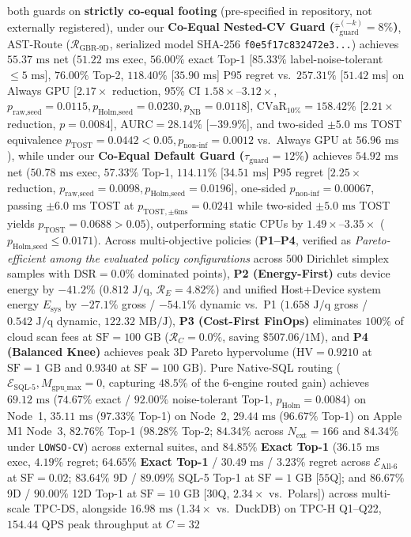 \documentclass[10pt,a4paper]{article}
\begin{document}
both guards on \textbf{strictly co-equal footing} (pre-specified in repository, not externally registered), under our \textbf{Co-Equal Nested-CV Guard ($\hat{\tau}_{\text{guard}}^{(-k)}=8\%$)}, AST-Route ($\mathcal{R}_{\text{GBR-9D}}$, serialized model SHA-256 \texttt{f0e5f17c832472e3...}) achieves $55.37\text{ ms}$ net ($51.22\text{ ms}$ exec, $56.00\%$ exact Top-1 [$85.33\%$ label-noise-tolerant $\le 5\text{ ms}$], $76.00\%$ Top-2, $118.40\%$ [$35.90\text{ ms}$] P95 regret vs.\ $257.31\%$ [$51.42\text{ ms}$] on Always GPU [$2.17\times$ reduction, 95\% CI $1.58\times\text{--}3.12\times$, $p_{\text{raw,seed}}=0.0115, p_{\text{Holm,seed}}=0.0230, p_{\text{NB}}=0.0118$], $\text{CVaR}_{10\%}=158.42\%$ [$2.21\times$ reduction, $p=0.0084$], $\text{AURC}=28.14\%$ [$-39.9\%$], and two-sided $\pm 5.0\text{ ms}$ TOST equivalence $p_{\text{TOST}}=0.0442 < 0.05, p_{\text{non-inf}}=0.0012$ vs.\ Always GPU at $56.96\text{ ms}$), while under our \textbf{Co-Equal Default Guard ($\tau_{\text{guard}}=12\%$)} achieves $54.92\text{ ms}$ net ($50.78\text{ ms}$ exec, $57.33\%$ Top-1, $114.11\%$ [$34.51\text{ ms}$] P95 regret [$2.25\times$ reduction, $p_{\text{raw,seed}}=0.0098, p_{\text{Holm,seed}}=0.0196$], one-sided $p_{\text{non-inf}}=0.00067$, passing $\pm 6.0\text{ ms}$ TOST at $p_{\text{TOST},\pm 6\text{ms}}=0.0241$ while two-sided $\pm 5.0\text{ ms}$ TOST yields $p_{\text{TOST}}=0.0688 > 0.05$), outperforming static CPUs by $1.49\times\text{--}3.35\times$ ($p_{\text{Holm,seed}}\le 0.0171$). Across multi-objective policies (\textbf{P1--P4}, verified as \emph{Pareto-efficient among the evaluated policy configurations} across $500$ Dirichlet simplex samples with $\text{DSR}=0.0\%$ dominated points), \textbf{P2 (Energy-First)} cuts device energy by $-41.2\%$ ($0.812\text{ J/q}$, $\mathcal{R}_E=4.82\%$) and unified Host+Device system energy $E_{\text{sys}}$ by $-27.1\%$ gross / $-54.1\%$ dynamic vs.\ P1 ($1.658\text{ J/q}$ gross / $0.542\text{ J/q}$ dynamic, $122.32\text{ MB/J}$), \textbf{P3 (Cost-First FinOps)} eliminates $100\%$ of cloud scan fees at $\text{SF}=100\text{ GB}$ ($\mathcal{R}_C=0.0\%$, saving $\$507.06/1\text{M}$), and \textbf{P4 (Balanced Knee)} achieves peak 3D Pareto hypervolume ($\text{HV}=0.9210$ at $\text{SF}=1\text{ GB}$ and $0.9340$ at $\text{SF}=100\text{ GB}$). Pure Native-SQL routing ($\mathcal{E}_{\text{SQL-5}}, M_{\text{gpu\_max}}=0$, capturing $48.5\%$ of the 6-engine routed gain) achieves $69.12\text{ ms}$ ($74.67\%$ exact / $92.00\%$ noise-tolerant Top-1, $p_{\text{Holm}}=0.0084$) on Node~1, $35.11\text{ ms}$ ($97.33\%$ Top-1) on Node~2, $29.44\text{ ms}$ ($96.67\%$ Top-1) on Apple M1 Node~3, $82.76\%$ Top-1 ($98.28\%$ Top-2; $84.34\%$ across $N_{\text{ext}}=166$ and $84.34\%$ under \texttt{LOWSO-CV}) across external suites, and $\mathbf{84.85\%}$ \textbf{Exact Top-1} ($36.15\text{ ms}$ exec, $4.19\%$ regret; $\mathbf{64.65\%}$ \textbf{Exact Top-1} / $30.49\text{ ms}$ / $3.23\%$ regret across $\mathcal{E}_{\text{All-6}}$ at $\text{SF}=0.02$; $83.64\%$ 9D / $89.09\%$ SQL-5 Top-1 at $\text{SF}=1\text{ GB}$ [$55$Q]; and $86.67\%$ 9D / $90.00\%$ 12D Top-1 at $\text{SF}=10\text{ GB}$ [$30$Q, $2.34\times$ vs.\ Polars]) across multi-scale TPC-DS, alongside $16.98\text{ ms}$ ($1.34\times$ vs.\ DuckDB) on TPC-H Q1--Q22, $154.44\text{ QPS}$ peak throughput at $C=32$ 
\end{document}
